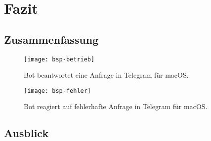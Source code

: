 \chapter{Fazit}

\section{Zusammenfassung}

\begin{figure}[h!]
\centering
\texttt{[image: bsp-betrieb]}
\caption{Bot beantwortet eine Anfrage in Telegram für macOS.}
\end{figure}

\begin{figure}[h!]
\centering
\texttt{[image: bsp-fehler]}
\caption{Bot reagiert auf fehlerhafte Anfrage in Telegram für macOS.}
\end{figure}

\section{Ausblick}


